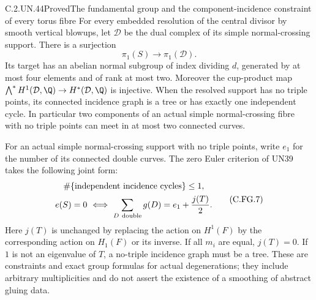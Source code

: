 \begin{statement}{C.2.UN.44}{Proved}{The fundamental group and the component-incidence constraint of every torus fibre}
For every embedded resolution of the central divisor by smooth
vertical blowups, let $\mathcal D$ be the dual complex of its simple
normal-crossing support. There is a surjection
\[
                  \pi_1(S)\longrightarrow\pi_1(\mathcal D).
                                                        \tag{C.FG.6}
\]
Its target has an abelian normal subgroup of index dividing $d$,
generated by at most four elements and of rank at most two.
Moreover the cup-product map
$\bigwedge^*H^1(\mathcal D,\Q)\to H^*(\mathcal D,\Q)$ is injective.
When the resolved support has
no triple points, its connected incidence graph is a tree or has
exactly one independent cycle. In particular two components of an
actual simple normal-crossing fibre with no triple points can meet
in at most two connected curves.

For an actual simple normal-crossing support with no triple points,
write $e_1$ for the number of its connected double curves. The zero
Euler criterion of UN39 takes the following joint form:
\[
 \begin{gathered}
 \#\{
      \text{independent incidence cycles}\}\le1,\\
 e(S)=0\ \Longleftrightarrow\
       \sum_{D\ {\rm double}}g(D)=e_1+\frac{j(T)}2 .
 \end{gathered}
                                                        \tag{C.FG.7}
\]
Here $j(T)$ is unchanged by replacing the action on $H^1(F)$ by
the corresponding action on $H_1(F)$ or its inverse. If all $m_i$
are equal, $j(T)=0$. If $1$ is not an eigenvalue of $T$, a
no-triple incidence graph must be a tree.
These are constraints and exact group formulas
for actual degenerations; they include arbitrary multiplicities
and do not assert the existence of a smoothing of abstract gluing data.
\end{statement}

